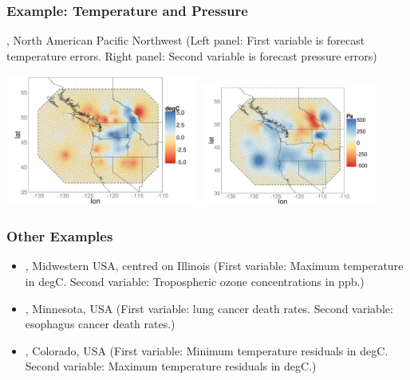 \documentclass{beamer}
\begin{document}
\begin{frame}
\frametitle{Example: Temperature and Pressure}
\citet*{Gneitingetal2010}, North American Pacific Northwest (Left panel: First variable is forecast temperature errors. Right panel: Second variable is forecast pressure errors)

\begin{center}
\includegraphics[width=2.5in]{./Temp.png}
\includegraphics[width=2.3in]{./Pressure.png}
\end{center}
\end{frame}


\begin{frame}
\frametitle{Other Examples}
\begin{itemize}
\item \cite{RoyleBerliner1999}, Midwestern USA, centred on Illinois (First variable: Maximum temperature in degC. Second variable: Tropospheric ozone concentrations in ppb.) \vfill
\item \citet*{Jin_2005}, Minnesota, USA (First variable: lung cancer death rates. Second variable: esophagus cancer death rates.) \vfill
\item \citet*{GentonKleiber2015}, Colorado, USA (First variable: Minimum temperature residuals in degC. Second variable: Maximum temperature residuals in degC.) \vfill
\end{itemize}
\vfill
\end{frame}
\end{document}
